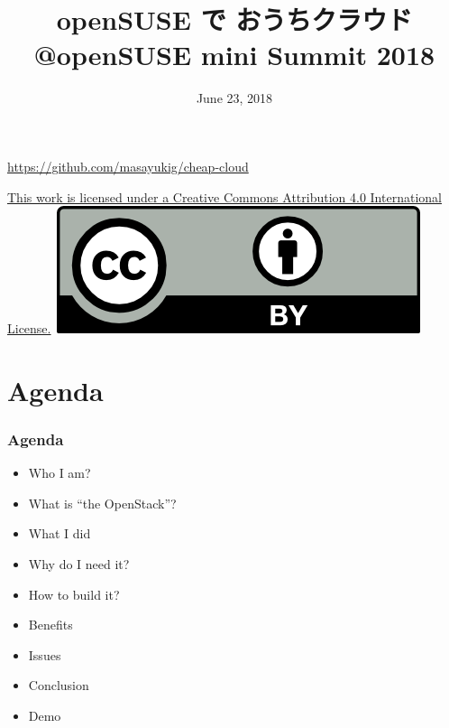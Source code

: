 \documentclass[aspectratio=169,11pt,hyperref={colorlinks=true}]{beamer}
\author[Masayuki Igawa]{%
    \texorpdfstring{%
        \begin{columns}
        \column{.45\linewidth}
            \centering
            Masayuki Igawa\\
            \href{mailto:masayuki@igawa.io}{masayuki@igawa.io}\\
            \texttt{masayukig on Freenode, GitHub, Twitter}
        \end{columns}
        }
    {Masayuki Igawa}
}
\date{June 23, 2018}
\title[private-cloud-on-openSUSE
  \hspace{2em}\insertframenumber/\inserttotalframenumber]{openSUSE で おうちクラウド
  \\ @openSUSE mini Summit 2018}
\begin{document}
{%
\begin{frame}[noframenumbering]
  \hypersetup{colorlinks,urlcolor=suse}
  \titlepage{}
  \centering
  \@place \par
  \href{https://github.com/masayukig/cheap-cloud}{https://github.com/masayukig/cheap-cloud}
  \vspace{1em}
  \begin{flushright}
    \tiny\href{https://creativecommons.org/licenses/by/4.0/}{This work
      is licensed under a Creative Commons Attribution 4.0
      International License.}~\includegraphics[scale=0.3]{cc_by.png}
  \end{flushright}
\end{frame}
}

\section{Agenda}
\begin{frame}
  \frametitle{Agenda}
  \begin{itemize}
    \item Who I am?
    \item What is ``the OpenStack''?
    \item What I did
    \item Why do I need it?
    \item How to build it?
    \item Benefits
    \item Issues
    \item Conclusion
    \item Demo
  \end{itemize}
\end{frame}
\end{document}
